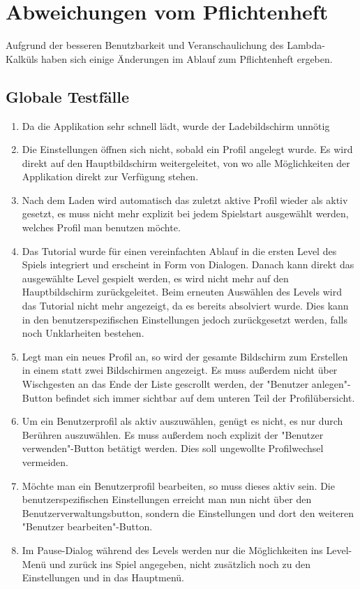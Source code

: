 \documentclass[parskip=full]{scrreprt}
\begin{document}
\chapter{Abweichungen vom Pflichtenheft}
Aufgrund der besseren Benutzbarkeit und Veranschaulichung des Lambda-Kalküls haben sich einige Änderungen im Ablauf zum Pflichtenheft ergeben.

\section{Globale Testfälle}
\begin{enumerate}
	\item Da die Applikation sehr schnell lädt, wurde der Ladebildschirm unnötig
	\item Die Einstellungen öffnen sich nicht, sobald ein Profil angelegt wurde. Es wird direkt auf den Hauptbildschirm weitergeleitet, von wo alle Möglichkeiten der Applikation direkt zur Verfügung stehen.
	\item Nach dem Laden wird automatisch das zuletzt aktive Profil wieder als aktiv gesetzt, es muss nicht mehr explizit bei jedem Spielstart ausgewählt werden, welches Profil man benutzen möchte.
	\item Das Tutorial wurde für einen vereinfachten Ablauf in die ersten Level des Spiels integriert und erscheint in Form von Dialogen. Danach kann direkt das ausgewählte Level gespielt werden, es wird nicht mehr auf den Hauptbildschirm zurückgeleitet. Beim erneuten Auswählen des Levels wird das Tutorial nicht mehr angezeigt, da es bereits absolviert wurde. Dies kann in den benutzerspezifischen Einstellungen jedoch zurückgesetzt werden, falls noch Unklarheiten bestehen.
	\item Legt man ein neues Profil an, so wird der gesamte Bildschirm zum Erstellen in einem statt zwei Bildschirmen angezeigt. Es muss außerdem nicht über Wischgesten an das Ende der Liste gescrollt werden, der "Benutzer anlegen"-Button befindet sich immer sichtbar auf dem unteren Teil der Profilübersicht.
	\item Um ein Benutzerprofil als aktiv auszuwählen, genügt es nicht, es nur durch Berühren auszuwählen. Es muss außerdem noch explizit der "Benutzer verwenden"-Button betätigt werden. Dies soll ungewollte Profilwechsel vermeiden.
	\item Möchte man ein Benutzerprofil bearbeiten, so muss dieses aktiv sein. Die benutzerspezifischen Einstellungen erreicht man nun nicht über den Benutzerverwaltungsbutton, sondern die Einstellungen und dort den weiteren "Benutzer bearbeiten"-Button.
	\item Im Pause-Dialog während des Levels werden nur die Möglichkeiten ins Level-Menü und zurück ins Spiel angegeben, nicht zusätzlich noch zu den Einstellungen und in das Hauptmenü.
\end{enumerate}
\end{document}
